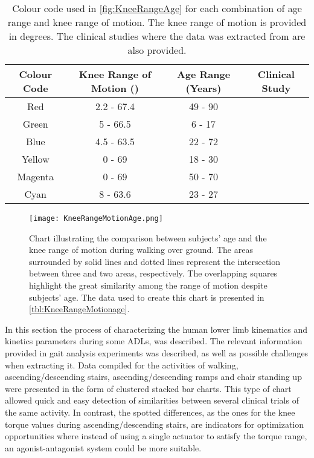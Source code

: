 \begin{table}[htb!]
\caption{Colour code used in \autoref{fig:KneeRangeAge} for each combination of age range and knee range of motion. The knee range of motion is provided in degrees. The clinical studies where the data was extracted from are also provided.}
\label{tbl:KneeRangeMotionage}
\begin{tabular}{c|c|c|c}
\hline
Colour Code & Knee Range of Motion (\degree{}) & Age Range (Years) & Clinical Study \\
\hline
Red         & 2.2 - 67.4               & 49 - 90           & \cite{rowe2000knee}       \\
Green       & 5 - 66.5                 & 6 - 17            & \cite{bovi2011multiple}        \\
Blue        & 4.5 - 63.5               & 22 - 72           & \cite{bovi2011multiple}           \\
Yellow      & 0 - 69                   & 18 - 30           & \cite{lee2008biomechanics}        \\
Magenta     & 0 - 69                   & 50 - 70           & \cite{lee2008biomechanics}     \\
Cyan        & 8 - 63.6                 & 23 - 27           & \cite{han2011biomechanical}    \\  
\hline
\end{tabular}
\end{table}

\begin{figure}[htb!]
    \centering
    \texttt{[image: KneeRangeMotionAge.png]}
    \caption{Chart illustrating the comparison between subjects' age and the knee range of motion
during walking over ground. The areas surrounded by solid lines and dotted lines represent the
intersection between three and two areas, respectively. The overlapping squares highlight the
great similarity among the range of motion despite subjects' age. The data used to create this
chart is presented in \autoref{tbl:KneeRangeMotionage}. }
    \label{fig:KneeRangeAge}
\end{figure}

In this section the process of characterizing the human lower limb kinematics and kinetics parameters during some ADLs, was described. The relevant information provided in gait analysis experiments was described, as well as possible challenges when extracting it. Data compiled for the activities of walking, ascending/descending stairs, ascending/descending ramps and chair standing up were presented in the form of clustered stacked bar charts. This type of chart allowed quick and easy detection of similarities between several clinical trials of the same activity. In contrast, the spotted differences, as the ones for the knee torque values during ascending/descending stairs, are indicators for optimization opportunities where instead of using a single actuator to satisfy the torque range, an agonist-antagonist system could be more suitable.


